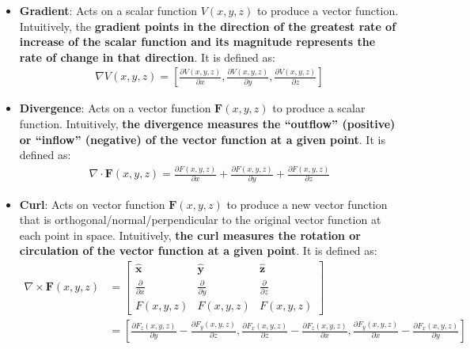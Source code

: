 \begin{itemize}
  \item \textbf{Gradient}: Acts on a scalar function \( V(x, y, z) \) to produce
    a vector function. Intuitively, the \textbf{gradient points in the direction of
    the greatest rate of increase of the scalar function and its magnitude
    represents the rate of change in that direction}. It is defined as:
    \begin{align*}
      \nabla V(x,y,z) = \left[\frac{\partial V(x,y,z)}{\partial x}, \frac{\partial V(x,y,z)}{\partial y}, \frac{\partial V(x,y,z)}{\partial z}\right]
    \end{align*}
  \item \textbf{Divergence}:  Acts on a vector function \( \mathbf{F}(x, y, z) \)
    to produce a scalar function. Intuitively, \textbf{the divergence
    measures  the ``outflow'' (positive) or ``inflow'' (negative) of the
    vector function at a given point}. It is defined as:
    \begin{align*}
      \nabla \cdot \mathbf{F}(x,y,z) = \frac{\partial F(x,y,z)}{\partial x} +
      \frac{\partial F(x,y,z)}{\partial y} +
      \frac{\partial F(x,y,z)}{\partial z}
    \end{align*}
  \item \textbf{Curl}: Acts on vector function \( \mathbf{F}(x, y, z) \) to
    produce a new vector function that is orthogonal/normal/perpendicular to
    the original vector function at each point in space. Intuitively, \textbf{
    the curl measures the rotation or circulation of the vector function at a
    given point}. It is defined as:
    \begin{align*}
      \nabla \times \mathbf{F}(x,y,z) &=
      \begin{bmatrix}
        \hat{\mathbf{x}} & \hat{\mathbf{y}} & \hat{\mathbf{z}}\\
        \frac{\partial}{\partial x} &
        \frac{\partial}{\partial y} &
        \frac{\partial}{\partial z}\\
        F(x,y,z) & F(x,y,z) & F(x,y,z)
      \end{bmatrix}\\
      &= \left[\frac{\partial F_z(x,y,z)}{\partial y} - \frac{\partial F_y(x,y,z)}{\partial z}, \frac{\partial F_x(x,y,z)}{\partial z} - \frac{\partial F_z(x,y,z)}{\partial x}, \frac{\partial F_y(x,y,z)}{\partial x} - \frac{\partial F_x(x,y,z)}{\partial y}\right]
    \end{align*}
\end{itemize}

